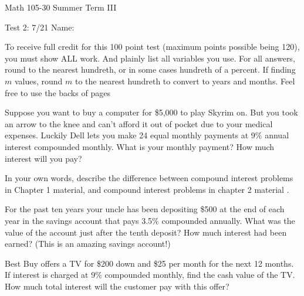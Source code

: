 \documentclass[11pt,epsfig]{article}
\begin{document}
Math 105-30 Summer Term III 

Test 2: 7/21 \hspace{1.9in} {Name:} {\underline {\hspace{3.5in}}}
\vspace{2pc}

To receive full credit for this 100 point test (maximum points possible being 120), you must show ALL work. And plainly list all variables you use. For all answers, round to the nearest hundreth, or in some cases hundreth of a percent. If finding $m$ values, round $m$ to the nearest hundreth to convert to years and months. Feel free to use the backs of pages
\vspace{2pc}



\begin{problem}{12}
Suppose you want to buy a computer for \$5,000 to play Skyrim on. But you took an arrow to the knee and can't afford it out of pocket due to your medical expenses. Luckily Dell lets you make 24 equal monthly payments at 9\% annual interest compounded monthly. What is your monthly payment? How much interest will you pay?

\vfill
\end{problem}

\begin{problem}{12}
In your own words, describe the difference between compound interest problems in Chapter 1 material, and compound interest problems in chapter 2 material .

\vfill
\end{problem}

\begin{problem}{12}
For the past ten years your uncle has been depositing \$500 at the end of each year in the savings account that pays 3.5\% compounded annually. What was the value of the account just after the tenth deposit? How much interest had been earned? (This is an amazing savings account!)

\vfill
\end{problem}

\newpage

\begin{problem}{12}
Best Buy offers a TV for \$200 down and \$25 per month for the next 12 months. If interest is charged at 9\% compounded monthly, find the cash value of the TV. How much total interest will the customer pay with this offer?

\vfill
\end{problem}
\end{document}
